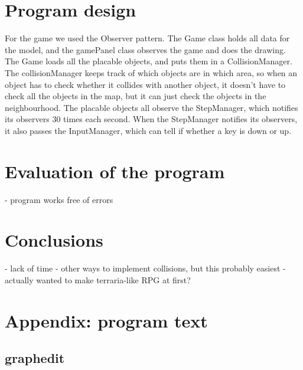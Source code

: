 \documentclass[a4paper]{article}
\begin{document}

\section{Program design}

For the game we used the Observer pattern.
The Game class holds all data for the model, and the gamePanel class observes the game and does the drawing.\\
The Game loads all the placable objects, and puts them in a CollisionManager.
The collisionManager keeps track of which objects are in which area, so when an object has to check whether it collides with another object, it doesn't have to check all the objects in the map, but it can just check the objects in the neighbourhood.
The placable objects all observe the StepManager, which notifies its observers 30 times each second.
When the StepManager notifies its observers, it also passes the InputManager, which can tell if whether a key is down or up.\\
 


\section{Evaluation of the program}
- program works free of errors



\section{Conclusions}

- lack of time
- other ways to implement collisions, but this probably easiest
- actually wanted to make terraria-like RPG at first?

\section{Appendix: program text}
\subsection{graphedit}

\end{document}
